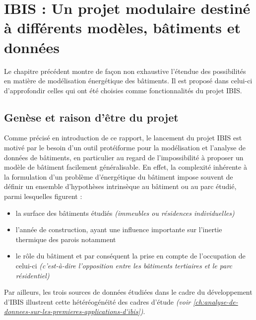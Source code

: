 \chapter{IBIS : Un projet modulaire destiné à différents modèles, bâtiments et données}\label{ch:ibis}
    Le chapitre précédent montre de façon non exhaustive l'étendue des possibilités en matière de modélisation énergétique des bâtiments.
    Il est proposé dans celui-ci d'approfondir celles qui ont été choisies comme fonctionnalités du projet IBIS\@.
\section{Genèse et raison d'être du projet}\label{sec:genese-et-raison-d'etre-du-projet}

    Comme précisé en introduction de ce rapport, le lancement du projet IBIS est motivé par le besoin d'un outil protéiforme pour la modélisation et l'analyse de données de bâtiments, en particulier au regard de l'impossibilité
    à proposer un modèle de bâtiment facilement généralisable.
    En effet, la complexité inhérente à la formulation d'un problème d'énergétique du bâtiment impose souvent de définir un ensemble d'hypothèses intrinsèque au bâtiment ou au parc étudié, parmi lesquelles figurent :
    \begin{itemize}
        \item la surface des bâtiments étudiés \textit{(immeubles ou résidences individuelles)}
        \item l'année de construction, ayant une influence importante sur l'inertie thermique des parois notamment
        \item le rôle du bâtiment et par conséquent la prise en compte de l'occupation de celui-ci \textit{(c'est-à-dire l'opposition entre les bâtiments tertiaires et le parc résidentiel)}
    \end{itemize}

    Par ailleurs, les trois sources de données étudiées dans le cadre du développement d'IBIS illustrent cette hétéréogénéité des cadres d'étude \textit{(voir \ref{ch:analyse-de-donnees-sur-les-premieres-applications-d'ibis})}.


